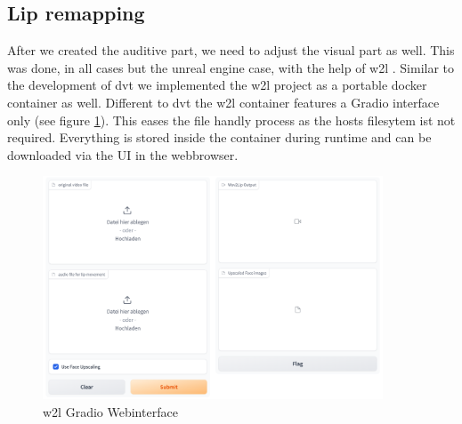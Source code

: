\documentclass[
  a4paper,  %
  twoside,  %
  bibliography=totoc,
  headsepline,
  cleardoublepage=empty,
  parskip=half,
  draft=false
]{scrbook}
\begin{document}
\subsection{Lip remapping}
 After we created the auditive part, we need to adjust the visual part as well. This was done, in all cases but the unreal engine case, with the help of \gls{w2l} \cite{mukhopadhyayWav2LipAccuratelyLipsyncing2023}. Similar to the development of \gls{dvt} we implemented the \gls{w2l} project as a portable docker container as well. Different to \gls{dvt} the \gls{w2l} container features a Gradio interface only (see figure \ref{fig:w2l-gradio}). This eases the file handly process as the hosts filesytem ist not required. Everything is stored inside the container during runtime and can be downloaded via the UI in the webbrowser.
 \begin{figure}[h]
  \centering
  \includegraphics[width=0.9\textwidth]{./graphics/images/wav2lip/w2l-gradio.png}
  \caption{\gls{w2l} Gradio Webinterface}
  \label{fig:w2l-gradio}
\end{figure}
\end{document}
